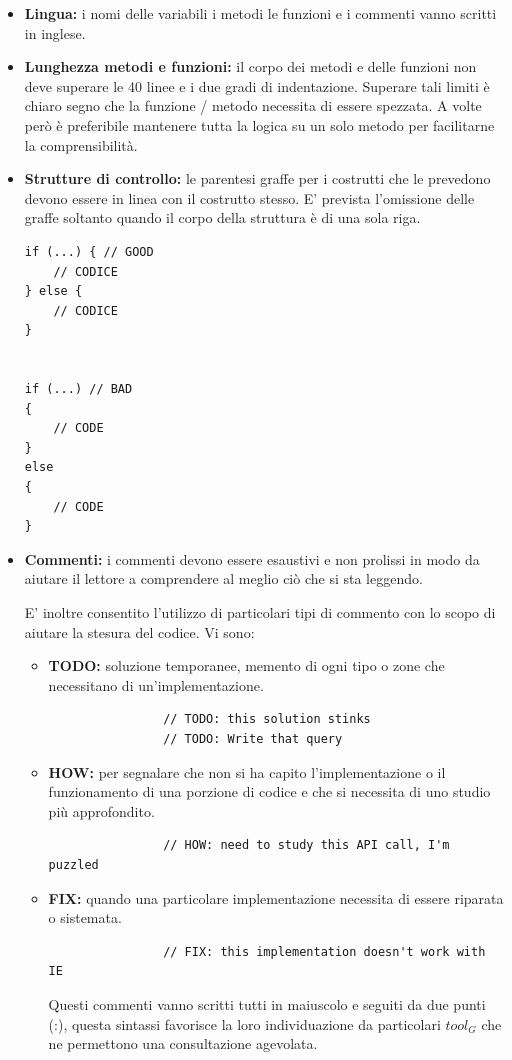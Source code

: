\begin{itemize}
			\item \textbf{Lingua:} i nomi delle variabili i metodi le funzioni e i commenti vanno scritti in inglese.
			
			\item \textbf{Lunghezza metodi e funzioni:} il corpo dei metodi e delle funzioni non deve superare le 40 linee e i due gradi di indentazione. Superare tali limiti è chiaro segno che la funzione / metodo necessita di essere spezzata. A volte però è preferibile mantenere tutta la logica su un solo metodo per facilitarne la comprensibilità. 
			
			\item \textbf{Strutture di controllo:} le parentesi graffe per i costrutti che le prevedono devono essere in linea con il costrutto stesso. E' prevista l'omissione delle graffe soltanto quando il corpo della struttura è di una sola riga.
\begin{lstlisting}
if (...) { // GOOD
	// CODICE
} else {
	// CODICE
}


if (...) // BAD
{
 	// CODE
}
else 
{
	// CODE
}
\end{lstlisting}

			\item \textbf{Commenti:} i commenti devono essere esaustivi e non prolissi in modo da aiutare il lettore a comprendere al meglio ciò che si sta leggendo.			
			
			E' inoltre consentito l'utilizzo di particolari tipi di commento con lo scopo di aiutare la stesura del codice. Vi sono:
			\begin{itemize}
				\item \textbf{TODO:} soluzione temporanee, memento di ogni tipo o zone che necessitano di un'implementazione.
				\begin{lstlisting}
				// TODO: this solution stinks
				// TODO: Write that query
				\end{lstlisting}
				
				\item \textbf{HOW:} per segnalare che non si ha capito l'implementazione o il funzionamento di una porzione di codice e che si necessita di uno studio più approfondito.
				\begin{lstlisting}
				// HOW: need to study this API call, I'm puzzled
				\end{lstlisting}
				
				\item \textbf{FIX:} quando una particolare implementazione necessita di essere riparata o sistemata.
				\begin{lstlisting}
				// FIX: this implementation doesn't work with IE
				\end{lstlisting}
				Questi commenti vanno scritti tutti in maiuscolo e seguiti da due punti (:), questa sintassi favorisce la loro individuazione da particolari $tool_G$ che ne permettono una consultazione agevolata.
			\end{itemize}

			\end{itemize}
